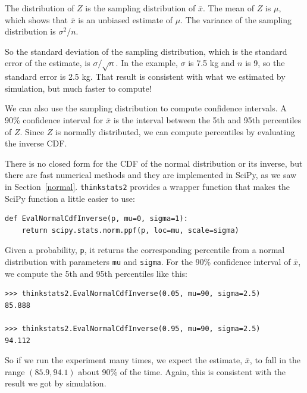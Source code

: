 \documentclass[12pt]{book}
\newcommand{\xbar}{\bar{x}}
\theoremstyle{exercise}
\begin{document}
The distribution of $Z$ is the sampling distribution of $\xbar$.
The mean of $Z$ is $\mu$, which shows that $\xbar$ is an unbiased
estimate of $\mu$.  The variance of the sampling distribution
is $\sigma^2 / n$.%
%

So the standard deviation of the sampling distribution, which is the
standard error of the estimate, is $\sigma / \sqrt{n}$.  In the
example, $\sigma$ is 7.5 kg and $n$ is 9, so the standard error is 2.5
kg.  That result is consistent with what we estimated by simulation,
but much faster to compute!%
%

We can also use the sampling distribution to compute confidence
intervals.  A 90\% confidence interval for $\xbar$ is the interval
between the 5th and 95th percentiles of $Z$.  Since $Z$ is normally
distributed, we can compute percentiles by evaluating the inverse
CDF.%
%
%

There is no closed form for the CDF of the normal distribution
or its inverse, but there are fast numerical methods and they
are implemented in SciPy, as we saw in Section~\ref{normal}.
{\tt thinkstats2} provides a wrapper function that makes the
SciPy function a little easier to use:%
%
%
%

\begin{verbatim}
def EvalNormalCdfInverse(p, mu=0, sigma=1):
    return scipy.stats.norm.ppf(p, loc=mu, scale=sigma)
\end{verbatim}

Given a probability, {\tt p}, it returns the corresponding
percentile from a normal distribution with parameters {\tt mu}
and {\tt sigma}.  For the 90\% confidence interval of $\xbar$,
we compute the 5th and 95th percentiles like this:%

\begin{verbatim}
>>> thinkstats2.EvalNormalCdfInverse(0.05, mu=90, sigma=2.5)
85.888

>>> thinkstats2.EvalNormalCdfInverse(0.95, mu=90, sigma=2.5)
94.112
\end{verbatim}

So if we run the experiment many times, we expect the
estimate, $\xbar$, to fall in the range $(85.9, 94.1)$ about
90\% of the time.  Again, this is consistent with the result
we got by simulation.%
\end{document}
